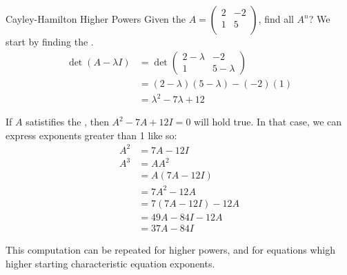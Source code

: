 \begin{example}{Cayley-Hamilton Higher Powers}
  Given the  $A =
  \begin{pmatrix}
    2 & -2 \\
    1 & 5 \\
  \end{pmatrix}$, find all $A^{n}$?
  We start by finding the .
  \begin{align*}
    \det (A - \lambda I) &= \det
                           \begin{pmatrix}
                             2-\lambda & -2 \\
                             1 & 5 - \lambda
                           \end{pmatrix} \\
                         &= (2-\lambda)(5 - \lambda) - (-2)(1) \\
                         &= \lambda^{2}- 7\lambda + 12
  \end{align*}

  If $A$ satistifies the , then $A^{2} - 7A + 12I = 0$ will hold true.
  In that case, we can express exponents greater than 1 like so:
  \begin{align*}
    A^{2} &= 7A - 12I \\
    A^{3} &= A A^{2} \\
          &= A (7A - 12I) \\
          &= 7A^{2} - 12A \\
          &= 7(7A-12I) - 12A \\
          &= 49A - 84I - 12A \\
          &= 37A - 84I
  \end{align*}

  This computation can be repeated for higher powers, and for equations whigh higher starting characteristic equation exponents.
\end{example}


